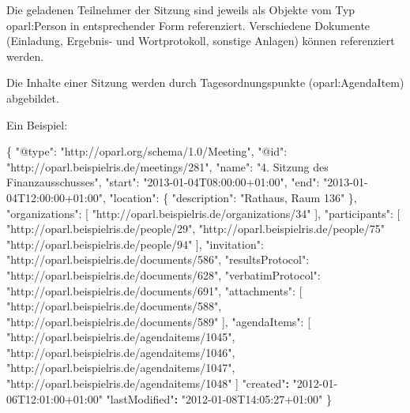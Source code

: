 \documentclass[,a4paper]{article}
\newenvironment{Shaded}{}{}
\newcommand{\DataTypeTok}[1]{\textcolor[rgb]{0.56,0.13,0.00}{{#1}}}
\newcommand{\StringTok}[1]{\textcolor[rgb]{0.25,0.44,0.63}{{#1}}}
\newcommand{\ErrorTok}[1]{\textcolor[rgb]{1.00,0.00,0.00}{\textbf{{#1}}}}
\newcommand{\NormalTok}[1]{{#1}}
\begin{document}
Die geladenen Teilnehmer der Sitzung sind jeweils als Objekte vom Typ
oparl:Person in entsprechender Form referenziert. Verschiedene Dokumente
(Einladung, Ergebnis- und Wortprotokoll, sonstige Anlagen) können
referenziert werden.

Die Inhalte einer Sitzung werden durch Tagesordnungspunkte
(oparl:AgendaItem) abgebildet.

Ein Beispiel:

\begin{Shaded}
\begin{Highlighting}[]
\NormalTok{\{}
    \DataTypeTok{"@type"}\NormalTok{: }\StringTok{"http://oparl.org/schema/1.0/Meeting"}\NormalTok{,}
    \DataTypeTok{"@id"}\NormalTok{: }\StringTok{"http://oparl.beispielris.de/meetings/281"}\NormalTok{,}
    \DataTypeTok{"name"}\NormalTok{: }\StringTok{"4. Sitzung des Finanzausschusses"}\NormalTok{,}
    \DataTypeTok{"start"}\NormalTok{: }\StringTok{"2013-01-04T08:00:00+01:00"}\NormalTok{,}
    \DataTypeTok{"end"}\NormalTok{: }\StringTok{"2013-01-04T12:00:00+01:00"}\NormalTok{,}
    \DataTypeTok{"location"}\NormalTok{: \{}
        \DataTypeTok{"description"}\NormalTok{: }\StringTok{"Rathaus, Raum 136"}
    \NormalTok{\},}
    \DataTypeTok{"organizations"}\NormalTok{: [}
        \StringTok{"http://oparl.beispielris.de/organizations/34"}
    \NormalTok{],}
    \DataTypeTok{"participants"}\NormalTok{: [}
        \StringTok{"http://oparl.beispielris.de/people/29"}\NormalTok{,}
        \StringTok{"http://oparl.beispielris.de/people/75"}
        \StringTok{"http://oparl.beispielris.de/people/94"}
    \NormalTok{],}
    \DataTypeTok{"invitation"}\NormalTok{: }\StringTok{"http://oparl.beispielris.de/documents/586"}\NormalTok{,}
    \DataTypeTok{"resultsProtocol"}\NormalTok{: }\StringTok{"http://oparl.beispielris.de/documents/628"}\NormalTok{,}
    \DataTypeTok{"verbatimProtocol"}\NormalTok{: }\StringTok{"http://oparl.beispielris.de/documents/691"}\NormalTok{,}
    \DataTypeTok{"attachments"}\NormalTok{: [}
        \StringTok{"http://oparl.beispielris.de/documents/588"}\NormalTok{,}
        \StringTok{"http://oparl.beispielris.de/documents/589"}
    \NormalTok{],}
    \DataTypeTok{"agendaItems"}\NormalTok{: [}
        \StringTok{"http://oparl.beispielris.de/agendaitems/1045"}\NormalTok{,}
        \StringTok{"http://oparl.beispielris.de/agendaitems/1046"}\NormalTok{,}
        \StringTok{"http://oparl.beispielris.de/agendaitems/1047"}\NormalTok{,}
        \StringTok{"http://oparl.beispielris.de/agendaitems/1048"}
    \NormalTok{]}
    \StringTok{"created"}\ErrorTok{:} \StringTok{"2012-01-06T12:01:00+01:00"}
    \StringTok{"lastModified"}\ErrorTok{:} \StringTok{"2012-01-08T14:05:27+01:00"}
\NormalTok{\}}
\end{Highlighting}
\end{Shaded}
\end{document}
